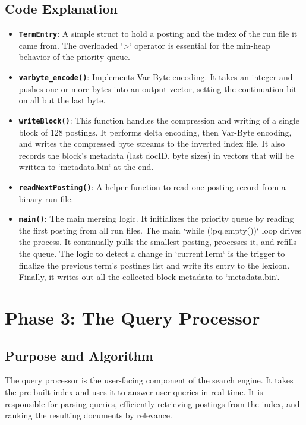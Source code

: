\documentclass[11pt, a4paper]{report}
\begin{document}
\section{Code Explanation}
\begin{itemize}
    \item \textbf{\texttt{TermEntry}}: A simple struct to hold a posting and the index of the run file it came from. The overloaded `>` operator is essential for the min-heap behavior of the priority queue.
    \item \textbf{\texttt{varbyte\_encode()}}: Implements Var-Byte encoding. It takes an integer and pushes one or more bytes into an output vector, setting the continuation bit on all but the last byte.
    \item \textbf{\texttt{writeBlock()}}: This function handles the compression and writing of a single block of 128 postings. It performs delta encoding, then Var-Byte encoding, and writes the compressed byte streams to the inverted index file. It also records the block's metadata (last docID, byte sizes) in vectors that will be written to `metadata.bin` at the end.
    \item \textbf{\texttt{readNextPosting()}}: A helper function to read one posting record from a binary run file.
    \item \textbf{\texttt{main()}}: The main merging logic. It initializes the priority queue by reading the first posting from all run files. The main `while (!pq.empty())` loop drives the process. It continually pulls the smallest posting, processes it, and refills the queue. The logic to detect a change in `currentTerm` is the trigger to finalize the previous term's postings list and write its entry to the lexicon. Finally, it writes out all the collected block metadata to `metadata.bin`.
\end{itemize}

\newpage
\chapter{Phase 3: The Query Processor}

\section{Purpose and Algorithm}
The query processor is the user-facing component of the search engine. It takes the pre-built index and uses it to answer user queries in real-time. It is responsible for parsing queries, efficiently retrieving postings from the index, and ranking the resulting documents by relevance.
\end{document}
